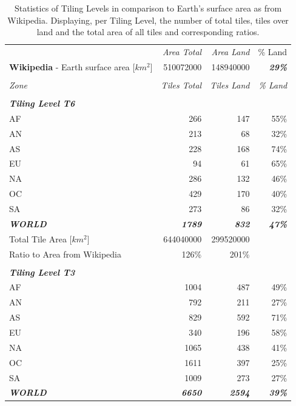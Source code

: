 \documentclass[10pt,a4paper]{article}
\begin{document}
\begin{table}[htbp]
  \centering
  \caption{Statistics of Tiling Levels in comparison to Earth's surface area as from Wikipedia. Displaying, per Tiling Level, the number of total tiles, tiles over land and the total area of all tiles and corresponding ratios.}
    \begin{tabular}{lrrr}
    \hline
     & \textit{Area Total} & \textit{Area Land} & \% Land \\
    \textbf{Wikipedia} - Earth surface area [$km^{2}$] & 510072000 & 148940000 & \textit{\textbf{29\%}} \\
    \\
    \hline
    \textit{Zone} & \textit{Tiles Total} & \textit{Tiles Land} & \textit{\% Land} \\
	\hline
	\\    
    \textit{\textbf{Tiling Level T6}} \\
    AF    & 266   & 147   & 55\% \\
    AN    & 213   & 68    & 32\% \\
    AS    & 228   & 168   & 74\% \\
    EU    & 94    & 61    & 65\% \\
    NA    & 286   & 132   & 46\% \\
    OC    & 429   & 170   & 40\% \\
    SA    & 273   & 86    & 32\% \\
    \hline
    \textit{\textbf{WORLD}} & \textit{\textbf{1789}} & \textit{\textbf{832}} & \textit{\textbf{47\%}} \\
    \hline
    Total Tile Area [$km^{2}$] & 644040000 & 299520000 &  \\
    Ratio to Area from Wikipedia & 126\% & 201\% &  \\
    \hline
    \\    
    \textit{\textbf{Tiling Level T3}} \\
    AF    & 1004  & 487   & 49\% \\
    AN    & 792   & 211   & 27\% \\
    AS    & 829   & 592   & 71\% \\
    EU    & 340   & 196   & 58\% \\
    NA    & 1065  & 438   & 41\% \\
    OC    & 1611  & 397   & 25\% \\
    SA    & 1009  & 273   & 27\% \\
    \hline
    \textit{\textbf{WORLD}} & \textit{\textbf{6650}} & \textit{\textbf{2594}} & \textit{\textbf{39\%}} \\

\end{tabular}
\end{table}
\end{document}
